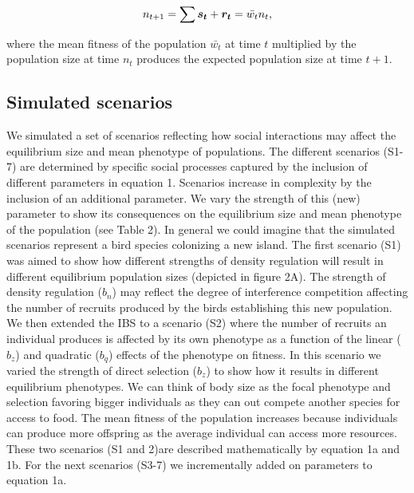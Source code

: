 \documentclass{article}
\begin{document}
\begin{equation}
n_{t+1}=\sum \vectorsym{s_{t}} + \vectorsym{r_{t}}=\bar{w_{t}}n_{t}, 
\end{equation}

\noindent where the mean fitness of the population $\bar{w_{t}}$ at time $t$  multiplied by the population size at time $n_{t}$ produces the expected population size at time $t + 1$. 

 
\subsection{Simulated scenarios}
We simulated a set of scenarios reflecting how social interactions may affect the equilibrium size and mean phenotype of populations. The different scenarios (S1-7) are determined by specific social processes captured by the inclusion of different parameters in equation 1. Scenarios increase in complexity by the inclusion of an additional parameter. We vary the strength of this (new) parameter to show its consequences on the equilibrium size and mean phenotype of the population (see Table 2). In general we could imagine that the simulated scenarios represent a bird species colonizing a new island. The first scenario (S1) was aimed to show how different strengths of density regulation will result in different equilibrium population sizes (depicted in figure 2A). The strength of density regulation ($b_n$) may reflect the degree of interference competition affecting the number of recruits produced by the birds establishing this new population. We then extended the IBS to a scenario (S2) where the number of recruits an individual produces is affected by its own phenotype as a function of the linear ($b_z$) and quadratic ($b_q$) effects of the phenotype on fitness. In this scenario we varied the strength of direct selection ($b_z$) to show how it results in different equilibrium phenotypes. We can think of body size as the focal phenotype and selection favoring bigger individuals as they can out compete another species for access to food. The mean fitness of the population increases because individuals can produce more offspring as the average individual can access more resources. These two scenarios (S1 and 2)are described mathematically by equation 1a and 1b. For the next scenarios (S3-7) we incrementally added on parameters to equation 1a.
\end{document}
